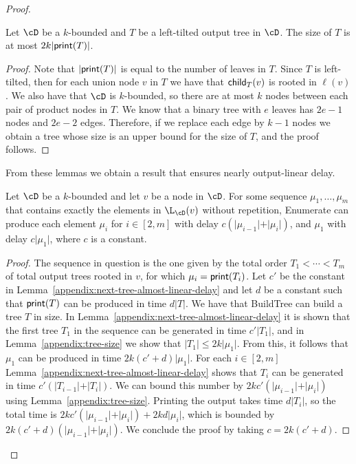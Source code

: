 \begin{proof}
	\begin{lemma}\label{appendix:tree-size}
		Let $\cD$ be a $k$-bounded \dsabbr and $T$ be a left-tilted output tree in $\cD$. The size of $T$ is at most $2k\vert {\sf print}(T)\vert$.
	\end{lemma}
	\begin{proof}
		Note that $\vert {\sf print}(T)\vert$ is equal to the number of leaves in $T$. Since $T$ is left-tilted, then  for each union node $v$ in $T$ we have that ${\sf child}_{T}(v)$ is rooted in $\ell(v)$. We also have that $\cD$ is $k$-bounded, so there are at most $k$ nodes between each pair of product nodes in $T$. We know that a binary tree with $e$ leaves has $2e-1$ nodes and $2e-2$ edges. Therefore, if we replace each edge by $k-1$ nodes we obtain a tree whose size is an upper bound for the size of $T$, and the proof follows.
	\end{proof}
	
	From these lemmas we obtain a result that ensures nearly output-linear delay.
	
	\begin{claim}\label{appendix:ds-almost-linear-delay}
		Let $\cD$ be a $k$-bounded \dsabbr and let $v$ be a node in $\cD$. For some sequence $\mu_1,\ldots,\mu_m$ that contains exactly the elements in $\L_{\cD}(v)$ without repetition, {\sc Enumerate} can produce each element $\mu_i$ for $i\in[2,m]$ with delay $c(\vert \mu_{i-1}\vert + \vert \mu_i\vert)$, and $\mu_1$ with delay $c\vert\mu_1\vert$, where $c$ is a constant.
	\end{claim}
	\begin{proof}
		The sequence in question is the one given by the total order $T_1<\cdots <T_m$ of total output trees rooted in $v$, for which $\mu_i = {\sf print}(T_i)$. Let $c'$ be the constant in Lemma~\ref{appendix:next-tree-almost-linear-delay} and let $d$ be a constant such that ${\sf print}(T)$ can be produced in time $d\vert T \vert$. We have that {\sc BuildTree} can build a tree $T$ in size. In Lemma~\ref{appendix:next-tree-almost-linear-delay} it is shown that the first tree $T_1$ in the sequence can be generated in time $c'\vert T_1\vert$, and in Lemma~\ref{appendix:tree-size} we show that $\vert T_1\vert \leq 2k\vert \mu_1\vert$. From this, it follows that $\mu_1$ can be produced in time $2k(c'+d)\vert \mu_1\vert$. For each $i\in[2,m]$ Lemma~\ref{appendix:next-tree-almost-linear-delay} shows that $T_i$ can be generated in time $c'(\vert T_{i-1}\vert + \vert T_i\vert)$. We can bound this number by $2kc'(\vert \mu_{i-1}\vert + \vert \mu_i\vert)$ using Lemma~\ref{appendix:tree-size}. Printing the output takes time $d\vert T_i\vert$, so the total time is $2kc'(\vert \mu_{i-1}\vert + \vert \mu_i\vert) + 2kd\vert \mu_i\vert$, which is bounded by $2k(c'+d)(\vert \mu_{i-1}\vert + \vert \mu_i\vert)$. We conclude the proof by taking $c = 2k(c'+d)$.
	\end{proof}
	

\end{proof}
